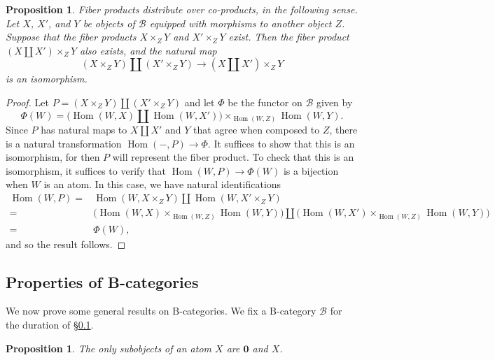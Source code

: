 \documentclass[12pt]{amsart}
\numberwithin{equation}{section}
\newtheorem{proposition}[equation]{Proposition}
\theoremstyle{definition}
\newcommand{\cB}{\mathcal{B}}
\newcommand{\rB}{\mathrm{B}}
\DeclareMathOperator{\Hom}{Hom}
\newcommand{\bzero}{\mathbf{0}}
\begin{document}
\begin{proposition} \label{prop:B0-fiber}
Fiber products distribute over co-products, in the following sense. Let $X$, $X'$, and $Y$ be objects of $\cB$ equipped with morphisms to another object $Z$. Suppose that the fiber products $X \times_Z Y$ and $X' \times_Z Y$ exist. Then the fiber product $(X \amalg X') \times_Z Y$ also exists, and the natural map
\begin{displaymath}
(X \times_Z Y) \amalg (X' \times_Z Y) \to (X \amalg X') \times_Z Y
\end{displaymath}
is an isomorphism.
\end{proposition}

\begin{proof}
Let $P=(X \times_Z Y) \amalg (X' \times_Z Y)$ and let $\Phi$ be the functor on $\cB$ given by
\begin{displaymath}
\Phi(W) = \big( \Hom(W, X) \amalg \Hom(W, X') \big) \times_{\Hom(W,Z)} \Hom(W,Y).
\end{displaymath}
Since $P$ has natural maps to $X \amalg X'$ and $Y$ that agree when composed to $Z$, there is a natural transformation $\Hom(-, P) \to \Phi$. It suffices to show that this is an isomorphism, for then $P$ will represent the fiber product. To check that this is an isomorphism, it suffices to verify that $\Hom(W,P) \to \Phi(W)$ is a bijection when $W$ is an atom. In this case, we have natural identifications
\begin{align*}
\Hom(W, P)
=& \Hom(W, X \times_Z Y) \amalg \Hom(W, X' \times_Z Y) \\
=& \big( \Hom(W, X) \times_{\Hom(W,Z)} \Hom(W,Y) \big) \amalg \big( \Hom(W,X') \times_{\Hom(W,Z)} \Hom(W,Y) \big) \\
=& \Phi(W),
\end{align*}
and so the result follows.
\end{proof}

\subsection{Properties of B-categories} \label{ss:B-prop}

We now prove some general results on $\rB$-categories. We fix a $\rB$-category $\cB$ for the duration of \S \ref{ss:B-prop}.

\begin{proposition} \label{prop:subatomic}
The only subobjects of an atom $X$ are $\bzero$ and $X$.
\end{proposition}
\end{document}
